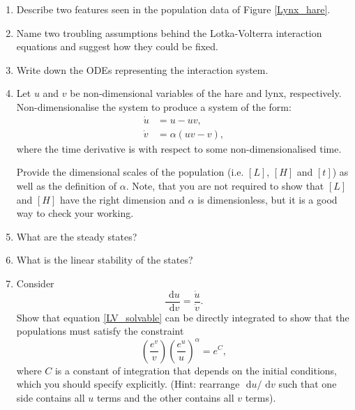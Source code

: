 \documentclass[]{article}
\newcommand{\bb}{\begin{equation}}
\newcommand{\ee}{\end{equation}}
\newcommand{\rd}{\text{ d}}
\newcommand{\fig}[1]{Figure \ref{#1}}
\newcommand{\eqn}[1]{equation \eqref{#1}}
\renewcommand{\l}{\left(}
\renewcommand{\r}{\right)}
\begin{document}
\begin{enumerate}
\item Describe two features seen in the population data of \fig{Lynx_hare}.
\item Name two troubling assumptions behind the Lotka-Volterra interaction equations and suggest how they could be fixed.
\item Write down the ODEs representing the interaction system.
\item Let $u$ and $v$ be non-dimensional variables of the hare and lynx, respectively. Non-dimensionalise the system to produce a system of the form:
\begin{align}
\dot{u}&=u-uv,\label{LV1}\\
\dot{v}&=\alpha(uv-v)\label{LV2},
\end{align}
where the time derivative is with respect to some non-dimensionalised time.

Provide the dimensional scales of the population (i.e. $[L]$, $[H]$ and $[t]$) as well as the definition of $\alpha$. Note, that you are not required to show that $[L]$ and $[H]$ have the right dimension and $\alpha$ is dimensionless, but it is a good way to check your working.
\item What are the steady states?
\item What is the linear stability of the states?
\item Consider
\bb
\frac{\rd u}{\rd v}=\frac{\dot{u}}{\dot{v}}.\label{LV_solvable}
\ee
Show that \eqn{LV_solvable} can be directly integrated to show that the populations must satisfy the constraint
\bb
\l\frac{e^{v}}{v}\r\l\frac{e^{u}}{u}\r^\alpha=e^{C},\label{LV_conserved}
\ee
where $C$ is a constant of integration that depends on the initial conditions, which you should specify explicitly. (Hint: rearrange $\rd u/\rd v$ such that one side contains all $u$ terms and the other contains all $v$ terms).
\end{enumerate}
\end{document}
